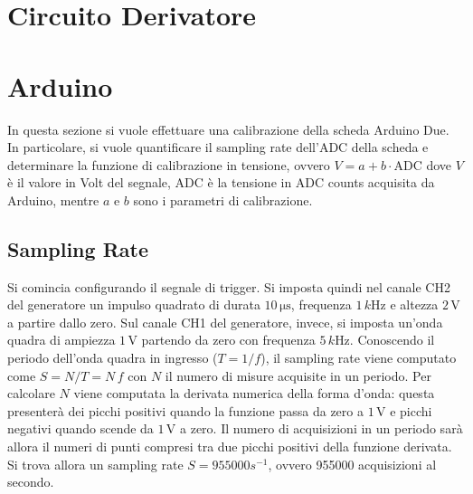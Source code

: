 \documentclass[a4paper,11pt]{article} %
\begin{document}

\section{Circuito Derivatore}

\cleardoublepage
\cleardoublepage
\section{Arduino}
In questa sezione si vuole effettuare una calibrazione della scheda Arduino Due. In particolare, si vuole quantificare
il sampling rate dell'ADC della scheda e determinare la funzione di calibrazione in tensione, ovvero $V = a
+ b \cdot \text{ADC}$ dove $V$ è il valore in Volt del segnale, $\text{ADC}$ è la tensione in ADC counts acquisita da
Arduino, mentre $a$ e $b$ sono i parametri di calibrazione. 


\subsection{Sampling Rate}
Si comincia configurando il segnale di trigger. Si imposta quindi nel canale CH2 del generatore un impulso quadrato di
durata $10\,\si{\us}$, frequenza $1\,\si{k\hertz}$ e altezza $2\,\si{\volt}$ a partire dallo zero. Sul canale CH1 del
generatore, invece, si imposta un'onda quadra di ampiezza $1\,\si{\volt}$ partendo da zero con frequenza
$5\,\si{k\hertz}$. Conoscendo il periodo dell'onda quadra in ingresso ($T=1/f$), il sampling rate viene computato come
$S = N / T = N \, f$ con $N$ il numero di misure acquisite in un periodo. Per calcolare $N$ viene computata la derivata
numerica della forma d'onda: questa presenterà dei picchi positivi quando la funzione passa da zero a $1\,\si{\volt}$ e
picchi negativi quando scende da $1\,\si{\volt}$ a zero. Il numero di acquisizioni in un periodo sarà allora il numeri
di punti compresi tra due picchi positivi della funzione derivata. Si trova allora un sampling rate $S = 955000 s^{-1}$,
ovvero 955000 acquisizioni al secondo.
\end{document}
